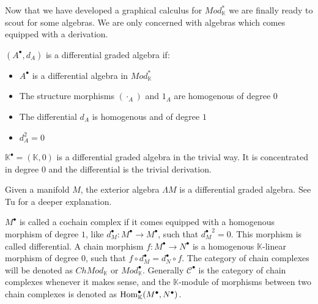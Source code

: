 \documentclass[../thesis.tex]{subfiles}
\begin{document}
            Now that we have developed a graphical calculus for $Mod_\mathbb{K}^*$ we are finally ready to scout for some algebras. We are only concerned with algebras which comes equipped with a derivation.

            \begin{definition}
                $(A^\bullet,d_A)$ is a differential graded algebra if:
                \begin{itemize}
                    \item $A^\bullet$ is a differential algebra in $Mod_\mathbb{K}^*$
                    \item The structure morphisms $(\cdot_A)$ and $1_A$ are homogenous of degree $0$
                    \item The differential $d_A$ is homogenous and of degree $1$
                    \item $d_A^2 = 0$ 
                \end{itemize}
            \end{definition}

            \begin{example}
                $\mathbb{K}^\bullet = (\mathbb{K},0)$ is a differential graded algebra in the trivial way. It is concentrated in degree $0$ and the differential is the trivial derivation.
            \end{example}
            \begin{example}
                Given a manifold $M$, the exterior algebra $\Lambda M$ is a differential graded algebra. See Tu \cite{Tu07} for a deeper explanation.
            \end{example}

            $M^{\bullet}$ is called a cochain complex if it comes equipped with a homogenous morphism of degree $1$, like $d_M^{\bullet}:M^{\bullet}\rightarrow M^{\bullet}$, such that ${d_M^{\bullet}}^2=0$. This morphism is called differential. A chain morphism $f: M^{\bullet}\rightarrow N^{\bullet}$ is a homogenous $\mathbb{K}$-linear morphism of degree $0$, such that $f\circ d_M^{\bullet} = d_N^{\bullet}\circ f$. The category of chain complexes will be denoted as $ChMod_{\mathbb{K}}$ or $Mod_\mathbb{K}^\bullet$. Generally $\mathcal{C}^\bullet$ is the category of chain complexes whenever it makes sense, and the $\mathbb{K}$-module of morphisms between two chain complexes is denoted as $\tt{Hom}_{\mathbb{K}}^{\bullet}(M^{\bullet},N^{\bullet})$.
\end{document}
